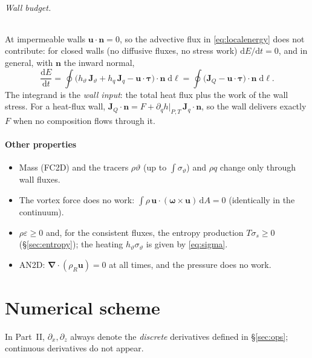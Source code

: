 \documentclass[11pt,a4paper]{article}
\newcommand{\vt}{\vartheta}                    %
\newcommand{\hth}{{h_{\vartheta}}}               %
\newcommand{\hq}{{h_q}}                          %
\newcommand{\bu}{\mathbf{u}}
\newcommand{\bn}{\mathbf{n}}
\newcommand{\bJ}{\mathbf{J}}
\newcommand{\bnabla}{\boldsymbol{\nabla}}
\newcommand{\btau}{\boldsymbol{\tau}}
\newcommand{\bomega}{\boldsymbol{\omega}}
\begin{document}
\paragraph{Wall budget.} At impermeable walls $\bu\cdot\bn=0$, so the advective flux in \eqref{eq:localenergy} does not contribute: for closed walls (no diffusive fluxes, no stress work) $\mathrm{d}E/\mathrm{d}t=0$, and in general, with $\bn$ the inward normal,
\begin{equation}
  \frac{\mathrm{d}E}{\mathrm{d}t}=\oint\Big(\hth\,\bJ_\vt+\hq\,\bJ_q-\bu\cdot\btau\Big)\!\cdot\bn\;\mathrm{d}\ell
  =\oint\Big(\bJ_Q-\bu\cdot\btau\Big)\!\cdot\bn\;\mathrm{d}\ell .
  \label{eq:wallinput}
\end{equation}
The integrand is the \emph{wall input}: the total heat flux plus the work of the wall stress. For a heat-flux wall, $\bJ_Q\cdot\bn=F+\partial_qh|_{P,T}\,\bJ_q\cdot\bn$, so the wall delivers exactly $F$ when no composition flows through it.

\subsection{Other properties}
\begin{itemize}
  \item Mass (FC2D) and the tracers $\rho\vt$ (up to $\int\sigma_\vt$) and $\rho q$ change only through wall fluxes.
  \item The vortex force does no work: $\int\rho\,\bu\cdot(\bomega\times\bu)\,\mathrm{d}A=0$ (identically in the continuum).
  \item $\rho\varepsilon\ge0$ and, for the consistent fluxes, the entropy production $T\sigma_s\ge0$ (\S\ref{sec:entropy}); the heating $\hth\sigma_\vt$ is given by \eqref{eq:sigma}.
  \item AN2D: $\bnabla\!\cdot(\rho_R\bu)=0$ at all times, and the pressure does no work.
\end{itemize}

\part{Numerical scheme}

In Part~II, $\partial_x,\partial_z$ always denote the \emph{discrete} derivatives defined in \S\ref{sec:ops}; continuous derivatives do not appear.
\end{document}
